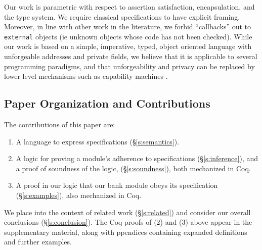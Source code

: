 \vspace{.02in}
Our work %
{is 
parametric} with respect to assertion
satisfaction, encapsulation, and the type system.
We require  
classical specifications to have explicit framing.
{{Moreover, in line} with other work in the literature,} we forbid 
``callbacks'' out to  { \color{blue}\texttt{external}} objects (ie unknown objects
whose code has not been checked).   While our work is based on 
  a simple, imperative, typed, object oriented
language with unforgeable addresses and private fields, we believe
 that %
 it is applicable to several programming paradigms, and 
 that   unforgeability and privacy
 can be replaced 
 by lower level mechanisms such as capability machines \cite{vanproving,davis2019cheriabi}.
 


\subsection{Paper Organization and Contributions}


%
The contributions of this paper are:\begin{enumerate}
 \item
A language to
express \Nec specifications (\S\ref{s:semantics}).

 \item
A logic for proving a module's adherence to 
 \Nec specifications (\S\ref{s:inference}), and a proof of soundness of the logic, (\S\ref{s:soundness}),
both mechanized in Coq. 
 \item
A proof in our logic %
  that our bank module obeys its \Nec specification (\S\ref{s:examples}),  also  mechanized in Coq.
\end{enumerate}




 We place \Nec into the context of 
related work (\S\ref{s:related}) and consider our overall conclusions
(\S\ref{s:conclusion}). 
%
The Coq proofs of 
(2) and (3) above appear in the
supplementary material, along with ppendices containing expanded 
definitions and further examples.
